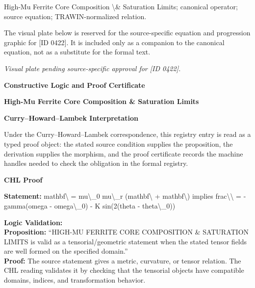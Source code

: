 High-Mu Ferrite Core Composition \textbackslash{}\& Saturation Limits; canonical operator; source equation; TRAWIN-normalized relation.
\endgroup

\begingroup\footnotesize\sloppy
The visual plate below is reserved for the source-specific equation and progression graphic for [ID 0422]. It is included only as a companion to the canonical equation, not as a substitute for the formal text.
\par\endgroup
\begingroup\footnotesize\itshape
Visual plate pending source-specific approval for [ID 0422].
\par\endgroup

\clearpage
\begingroup\tzpsupportsetup
\noindent\textbf{\fontsize{10.8pt}{12.8pt}\selectfont [ID 0422] Constructive Logic and Proof Certificate}\par
\noindent\textbf{\fontsize{10pt}{12pt}\selectfont High-Mu Ferrite Core Composition \& Saturation Limits}\par
\vspace{0.45em}
\begingroup
\footnotesize
\setlength{\parskip}{0.22em}
\setlength{\parindent}{0pt}
\noindent\textbf{Curry--Howard--Lambek Interpretation}\par
Under the Curry--Howard--Lambek correspondence, this registry entry is read as a typed proof
object: the stated source condition supplies the proposition, the derivation supplies the
morphism, and the proof certificate records the machine handles needed to check the obligation
in the formal registry.

\vspace{0.45em}
\noindent\textbf{CHL Proof}\par
\textbf{Statement:} mathbf\textbackslash{} = mu\textbackslash{}\_0 mu\textbackslash{}\_r (mathbf\textbackslash{} + mathbf\textbackslash{}) implies frac\textbackslash{}\textbackslash{} = -gamma(omega - omega\textbackslash{}\_0) - K
sin(2(theta - theta\textbackslash{}\_0))

\textbf{Logic Validation:}\\
\textbf{Proposition:} ``HIGH-MU FERRITE CORE COMPOSITION \& SATURATION LIMITS is valid as a tensorial/geometric
statement when the stated tensor fields are well formed on the specified domain.''\\
\textbf{Proof:} The source statement gives a metric, curvature, or tensor relation. The CHL reading
validates it by checking that the tensorial objects have compatible domains, indices,
and transformation behavior.

